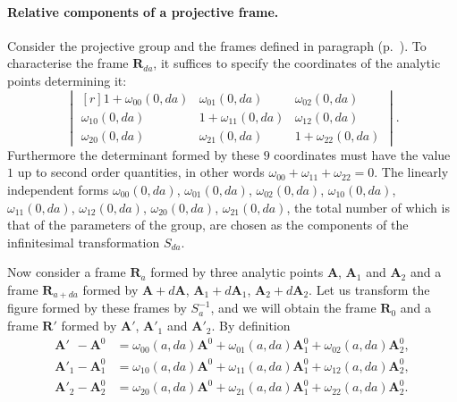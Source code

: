 \paragraph{Relative components of a projective frame.}
\label{sec:73}
Consider the projective group and the frames defined in paragraph  (p.~\pageref{sec:67}). To characterise the frame $\mathbf{R}_{da}$, it suffices to specify the coordinates of the analytic points determining it:
\[
\begin{vmatrix*}[r]
  1+\omega_{00}(0,da)&\omega_{01}(0,da)&\omega_{02}(0,da)\\
  \omega_{10}(0,da)&1+\omega_{11}(0,da)&\omega_{12}(0,da)\\
  \omega_{20}(0,da)&\omega_{21}(0,da)&1+\omega_{22}(0,da)
\end{vmatrix*}.
\]
Furthermore the determinant formed by these $9$ coordinates must have the value $1$ up to second order quantities, in other words $\omega_{00}+\omega_{11}+\omega_{22}=0$. The linearly independent forms $\omega_{00}(0,da)$, $\omega_{01}(0,da)$, $\omega_{02}(0,da)$, $\omega_{10}(0,da)$, $\omega_{11}(0,da)$, $\omega_{12}(0,da)$, $\omega_{20}(0,da)$, $\omega_{21}(0,da)$, the total number of which is that of the parameters of the group, are chosen as the components of the infinitesimal transformation $S_{da}$.

Now consider a frame $\mathbf{R}_{a}$ formed by three analytic points $\mathbf{A}$, $\mathbf{A}_{1}$ and $\mathbf{A}_{2}$ and a frame $\mathbf{R}_{a+da}$ formed by $\mathbf{A}+d\mathbf{A}$, $\mathbf{A}_{1}+d\mathbf{A}_{1}$, $\mathbf{A}_{2}+d\mathbf{A}_{2}$. Let us transform the figure formed by these frames by $S_{a}^{-1}$, and we will obtain the frame $\mathbf{R}_{0}$ and a frame $\mathbf{R}'$ formed by $\mathbf{A}'$, $\mathbf{A}'_{1}$ and $\mathbf{A}'_{2}$. By definition
\begin{align*}
  \mathbf{A}'_{\phantom{0}}-\mathbf{A}^{0}&=\omega_{00}(a,da)\mathbf{A}^{0}+\omega_{01}(a,da)\mathbf{A}^{0}_{1}+\omega_{02}(a,da)\mathbf{A}^{0}_{2},\\
  \mathbf{A}'_{1}-\mathbf{A}^{0}_{1}&=\omega_{10}(a,da)\mathbf{A}^{0}+\omega_{11}(a,da)\mathbf{A}^{0}_{1}+\omega_{12}(a,da)\mathbf{A}^{0}_{2},\\
  \mathbf{A}'_{2}-\mathbf{A}^{0}_{2}&=\omega_{20}(a,da)\mathbf{A}^{0}+\omega_{21}(a,da)\mathbf{A}^{0}_{1}+\omega_{22}(a,da)\mathbf{A}^{0}_{2}.
\end{align*}

